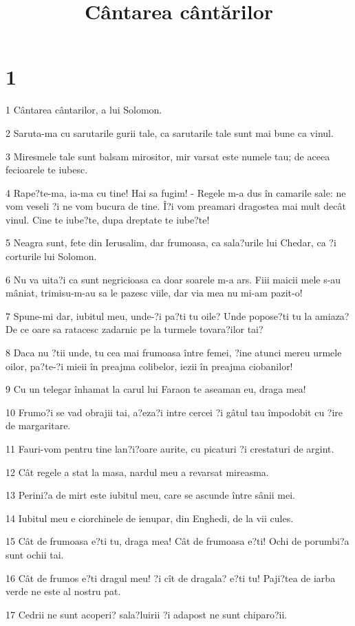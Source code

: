 

\title{Cântarea cântărilor}


\chapter{1}

\par 1 Cântarea cântarilor, a lui Solomon.
\par 2 Saruta-ma cu sarutarile gurii tale, ca sarutarile tale sunt mai bune ca vinul.
\par 3 Miresmele tale sunt balsam mirositor, mir varsat este numele tau; de aceea fecioarele te iubesc.
\par 4 Rape?te-ma, ia-ma cu tine! Hai sa fugim! - Regele m-a dus în camarile sale: ne vom veseli ?i ne vom bucura de tine. Î?i vom preamari dragostea mai mult decât vinul. Cine te iube?te, dupa dreptate te iube?te!
\par 5 Neagra sunt, fete din Ierusalim, dar frumoasa, ca sala?urile lui Chedar, ca ?i corturile lui Solomon.
\par 6 Nu va uita?i ca sunt negricioasa ca doar soarele m-a ars. Fiii maicii mele s-au mâniat, trimisu-m-au sa le pazesc viile, dar via mea nu mi-am pazit-o!
\par 7 Spune-mi dar, iubitul meu, unde-?i pa?ti tu oile? Unde popose?ti tu la amiaza? De ce oare sa ratacesc zadarnic pe la turmele tovara?ilor tai?
\par 8 Daca nu ?tii unde, tu cea mai frumoasa între femei, ?ine atunci mereu urmele oilor, pa?te-?i mieii în preajma colibelor, iezii în preajma ciobanilor!
\par 9 Cu un telegar înhamat la carul lui Faraon te aseaman eu, draga mea!
\par 10 Frumo?i se vad obrajii tai, a?eza?i intre cercei ?i gâtul tau împodobit cu ?ire de margaritare.
\par 11 Fauri-vom pentru tine lan?i?oare aurite, cu picaturi ?i crestaturi de argint.
\par 12 Cât regele a stat la masa, nardul meu a revarsat mireasma.
\par 13 Perini?a de mirt este iubitul meu, care se ascunde între sânii mei.
\par 14 Iubitul meu e ciorchinele de ienupar, din Enghedi, de la vii cules.
\par 15 Cât de frumoasa e?ti tu, draga mea! Cât de frumoasa e?ti! Ochi de porumbi?a sunt ochii tai.
\par 16 Cât de frumos e?ti dragul meu! ?i cît de dragala? e?ti tu! Paji?tea de iarba verde ne este al nostru pat.
\par 17 Cedrii ne sunt acoperi? sala?luirii ?i adapost ne sunt chiparo?ii.

